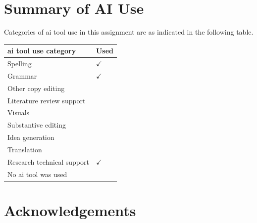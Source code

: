 \documentclass[11pt,a4paper]{report}
\begin{document}
\chapter*{Summary of AI Use}

Categories of \gls{ai} tool use in this assignment are as indicated in the following table.

\begin{table}[!htbp]
\centering
\begin{tabular}{ll}
\toprule
\textbf{\gls{ai} tool use category} & \textbf{Used} \\
\midrule
Spelling & $\checkmark$ \\
Grammar & $\checkmark$ \\
Other copy editing & \\
Literature review support & \\
Visuals & \\
Substantive editing & \\
Idea generation & \\
Translation & \\
Research technical support & $\checkmark$ \\
No \gls{ai} tool was used & \\
\bottomrule
\end{tabular}
\end{table}

\chapter*{Acknowledgements}



\end{document}
